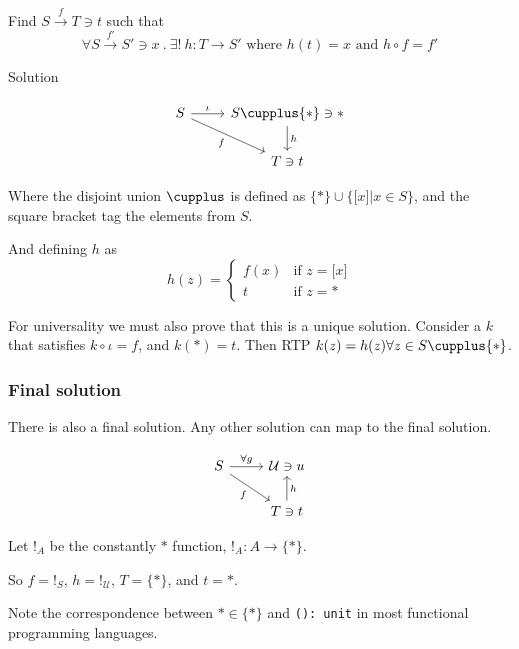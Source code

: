 \documentclass[a4paper, 12pt]{article}
\theoremstyle{definition}
\begin{document}
Find $S \overset{f}{\rightarrow} T \ni t$ such that
$$
\forall S \overset{f'}{\rightarrow} S' \ni x \ .\ 
\exists!\ h : T \rightarrow S' \text{ where }
h(t) = x \text{ and }
h \circ f = f'
$$

Solution

$$
    \begin{tikzcd}
        S \arrow[r, "\iota"]
          \arrow[dr, swap, "f"]
          & 
        S \cupplus \{\ast\} \ni \ast
          \arrow[d, "h"]
          \\
        {}
          &
        T \ni t
    \end{tikzcd}
$$

Where the disjoint union $\cupplus$ is defined as $\{\ast\} \cup \{ \lbrack
x\rbrack | x \in S \}$, and the square bracket tag the elements from $S$.

And defining $h$ as
\begin{equation*}
    h(z) = \begin{cases}
        f(x) & \text{if } z = \lbrack x \rbrack \\
        t & \text{if } z = \ast
    \end{cases}
\end{equation*}

For universality we must also prove that this is a unique solution.
Consider a $k$ that satisfies $k \circ \iota = f$, and $k(\ast) = t$. Then RTP
$k(z) = h(z) \forall z \in S \cupplus \{ \ast \}$.

\subsubsection*{Final solution}
There is also a final solution. Any other solution can map to the final
solution.

$$
    \begin{tikzcd}
        S \arrow[r, "\forall g"]
          \arrow[dr, swap, "f"]
          & 
        \mathcal{U} \ni u
          \\
        {}
          &
        T \ni t
          \arrow[u, swap, "h"]
    \end{tikzcd}
$$

Let $!_A$ be the constantly $\ast$ function, $!_A : A \rightarrow \{ \ast \}$.

So $f = !_S$, $h = !_{\mathcal{U}}$, $T = \{ \ast \}$, and $t = \ast$.

Note the correspondence between $\ast \in \{ \ast \}$ and \texttt{(): unit} in
most functional programming languages.
\end{document}
